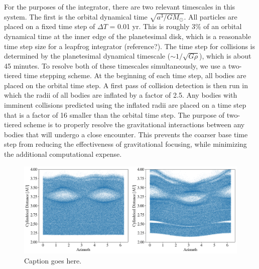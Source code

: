 \documentclass[twocolumn]{aastex63}
\begin{document}
For the purposes of the integrator, there are two relevant timescales in this system. The first is the orbital dynamical time $\sqrt{a^3/
G M_{\odot}}$. All particles are placed on a fixed time step of $\Delta T$ = 0.01 yr. This is roughly 3\% of an orbital dynamical time at 
the inner edge of the planetesimal disk, which is a reasonable time step size for a leapfrog integrator (reference?). The time step for 
collisions is determined by the planetesimal dynamical timescale ($\sim 1/\sqrt{G \rho}$), which is about 45 minutes. To resolve both 
of these timescales simultaneously, we use a two-tiered time stepping scheme. At the beginning of each time step, all bodies are 
placed on the orbital time step. A first pass of collision detection is then run in which the radii of all bodies are inflated by a factor of 
2.5. Any bodies with imminent collisions predicted using the inflated radii are placed on a time step that is a factor of 16 smaller than 
the orbital time step. The purpose of two-tiered scheme is to properly resolve the gravitational interactions between any bodies that 
will undergo a close encounter. This prevents the coarser base time step from reducing the effectiveness of gravitational focusing, 
while minimizing the additional computational expense.

\begin{figure}
    \includegraphics[width=\textwidth]{figures/rtheta.png}
    \caption{Caption goes here.\label{fig:rtheta}}
\end{figure}
\end{document}
